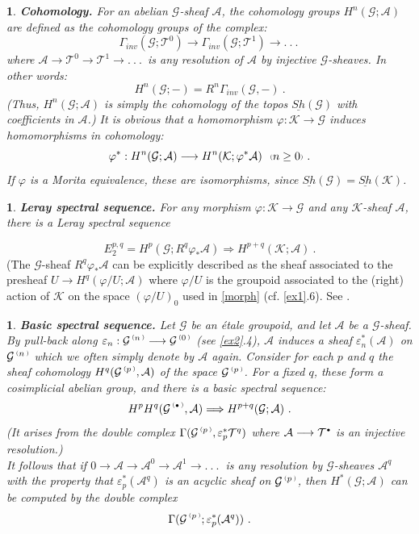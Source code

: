 \documentclass[a4paper]{article}
\newtheorem{num}[st]{}
\newcommand{\ii}{\ensuremath{\mathcal{T}}}
\newcommand{\f}{\ensuremath{\varphi}}
\newcommand{\rmap}{\longrightarrow}
\newcommand{\Ka}{\ensuremath{\mathcal{K}}}
\newcommand{\G}{\ensuremath{\mathcal{G}}}
\newcommand{\A}{\ensuremath{\mathcal{A}}}
\newcommand{\shG}{\ensuremath{\underline{Sh}(\G)}}
\newcommand{\shK}{\ensuremath{\underline{Sh}(\Ka)}}
\newcommand{\ps}{{\raise 1pt\hbox{\tiny (}}}
\newcommand{\pd}{{\raise 1pt\hbox{\tiny )}}}
\newcommand{\nG}[1]{\ensuremath{\G^{\,\ps #1\,\pd}}}
\def\cdot{{\raise 0.5pt\hbox{$\scriptscriptstyle\bullet$}}}
\begin{document}
\begin{num}
\label{cohom}
\emph{
{\bf Cohomology.} For an abelian $\G$-sheaf $\A$, the cohomology groups $H^{n}(\G; \A)$ are defined as the cohomology groups of the complex:
\[ \Gamma_{inv}(\G; \ii^{0}) \rmap \Gamma_{inv}(\G; \ii^{1}) \rmap  .\ .\ .\ \]
where $\A \rmap \ii^{0} \rmap \ii^{1} \rmap .\ .\ . $\ is any resolution of $\A$ by injective $\G$-sheaves. In other words:
\[ H^{n}(\G; -) = R^{n}\Gamma_{inv}(\G, -) \ .\]
(Thus, $H^{n}(\G; \A)$ is simply the cohomology of the topos $\shG$ with coefficients in $\A$.) It is obvious that a homomorphism $\f: \Ka \rmap \G$ induces homomorphisms in cohomology:
\[ \f^{*} : H^{n}(\G ; \A) \rmap H^{n}(\Ka ; \f^{*}\A) \ \ \ps n \geq 0\pd\  .\]
If $\f$ is a Morita equivalence, these are isomorphisms, since $\shG = \shK $.
}
\end{num} 



\begin{num}
\emph{
{\bf Leray spectral sequence.} For any morphism $\f : \Ka \rmap \G$ and any $\Ka$-sheaf $\A$, there is a Leray spectral sequence
}
\end{num}
\[ E^{p, q}_{2} = H^{p}(\G ; R^{q}\f_{*} \A)  \Longrightarrow H^{p+q}(\Ka ; \A) \ .\]
(The $\G$-sheaf $R^{q}\f_{*} \A$ can be explicitly described as the sheaf associated to the presheaf $U \rmap H^{q}(\f/U; \A)$ where $\f/U$ is the groupoid associated to the (right) action of $\Ka$ on the space $(\f/U)_{0}$ used in \ref{morph} (cf. \ref{ex1}.6). See \cite{SGA}.


\begin{num}
\label{basic}
\emph{
{\bf Basic spectral sequence.} Let $\G$ be an \'etale groupoid, and let $\A$ be a $\G$-sheaf. By pull-back along $\varepsilon_{n}: \nG{n} \rmap \nG{0}$ (see \ref{ex2}.4), $\A$ induces a sheaf $\varepsilon_{n}^{*}(\A)$ on $\nG{n}$ which we often simply denote by $\A$ again. Consider for each $p$ and $q$ the sheaf cohomology $H^{q}(\nG{p}, \A)$ of the space $\nG{p}$. For a fixed $q$, these form a cosimplicial abelian group, and there is a basic spectral sequence:
\[ H^{p}H^{q}(\nG{\cdot}, \A) \Longrightarrow  H^{p+q}(\G; \A)  \ .\]
(It arises from the double complex $\Gamma(\nG{p}, \varepsilon_{p}^{*}\ii^{q})$ where $\A \rmap \ii^{\cdot}$ is an injective resolution.) \\
\hspace*{.3in} It follows that if $0\rmap \A\rmap \A^{0}\rmap \A^{1}\rmap .\ .\ .\ $ is any resolution by $\G$-sheaves $\A^{q}$  with the property that $\varepsilon_{p}^{*}(\A^{q})$ is an acyclic sheaf on $\nG{p}$, then $H^{*}(\G; \A)$ can be computed by the double complex 
\[ \Gamma ( \nG{p} ; \varepsilon_{p}^{*}( \A^{q} )) \ .\]
}
\end{num}
\end{document}
